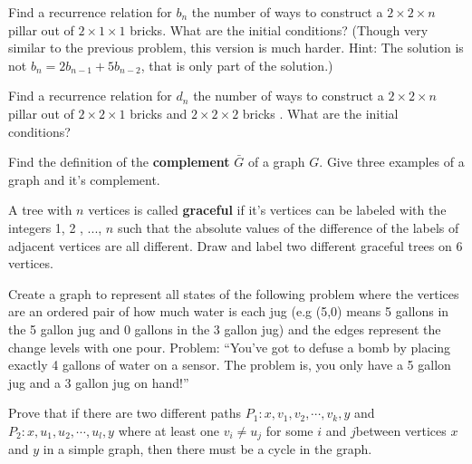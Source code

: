 \begin{exercise} Find a recurrence relation for $b_n$ the number of ways to construct a $2 \times 2 \times n$ pillar out of $ 2 \times 1 \times 1$ bricks.  What are the initial conditions? (Though very similar to the previous problem, this version is much harder.  Hint:  The solution is not $b_n=2b_{n-1}+5b_{n-2}$, that is only part of the solution.)
\end{exercise}

\begin{exercise} Find a recurrence relation for $d_n$ the number of ways to construct a $2 \times 2 \times n$ pillar out of $ 2 \times 2 \times 1$ bricks and $ 2 \times 2 \times 2$ bricks .  What are the initial conditions?
\end{exercise}

\begin{exercise}
Find the definition of the {\bf complement} $\bar{G}$ of a graph $G$. Give three examples of a graph and it's complement.
\end{exercise}


\begin{exercise}
A tree with $n$ vertices is called {\bf graceful} if it's vertices can be labeled with the integers 1, 2 , ..., $n$ such that the absolute values of the difference of the labels of adjacent vertices are all different.  Draw and label two different graceful trees on 6 vertices.
\end{exercise}


\begin{exercise}
Create a graph to represent all states of the following problem where the vertices are an ordered pair of how much water is each jug (e.g (5,0) means 5 gallons in the 5 gallon jug and 0 gallons in the 3 gallon jug) and the edges represent the change levels with one pour. Problem: ``You've got to defuse a bomb by placing exactly 4 gallons of water on a sensor. The problem is, you only have a 5 gallon jug and a 3 gallon jug on hand!''
\end{exercise}



\begin{proofp}
Prove that if there are two different paths $P_1: x, v_1, v_2, \cdots, v_k, y$ and $P_2: x, u_1, u_2, \cdots, u_l, y$  where at least one $v_i \neq u_j$ for some $i$ and $j$between vertices $x$ and $y$ in a simple graph, then there must be a cycle in the graph.
\end{proofp}



